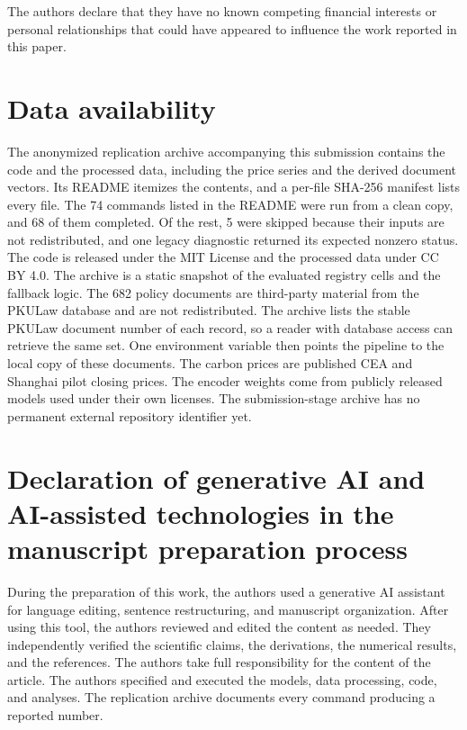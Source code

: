 \documentclass[5p,times,authoryear]{elsarticle}
\theoremstyle{plain}
\begin{document}
The authors declare that they have no known competing financial interests or personal relationships that could have appeared to influence the work reported in this paper.

\section*{Data availability}

The anonymized replication archive accompanying this submission contains the code and the processed data, including the price series and the derived document vectors. Its README itemizes the contents, and a per-file SHA-256 manifest lists every file. The 74 commands listed in the README were run from a clean copy, and 68 of them completed. Of the rest, 5 were skipped because their inputs are not redistributed, and one legacy diagnostic returned its expected nonzero status. The code is released under the MIT License and the processed data under CC BY 4.0. The archive is a static snapshot of the evaluated registry cells and the fallback logic. The 682 policy documents are third-party material from the PKULaw database and are not redistributed. The archive lists the stable PKULaw document number of each record, so a reader with database access can retrieve the same set. One environment variable then points the pipeline to the local copy of these documents. The carbon prices are published CEA and Shanghai pilot closing prices. The encoder weights come from publicly released models used under their own licenses. The submission-stage archive has no permanent external repository identifier yet.

\section*{Declaration of generative AI and AI-assisted technologies in the manuscript preparation process}

During the preparation of this work, the authors used a generative AI assistant for language editing, sentence restructuring, and manuscript organization. After using this tool, the authors reviewed and edited the content as needed. They independently verified the scientific claims, the derivations, the numerical results, and the references. The authors take full responsibility for the content of the article. The authors specified and executed the models, data processing, code, and analyses. The replication archive documents every command producing a reported number.
\end{document}
